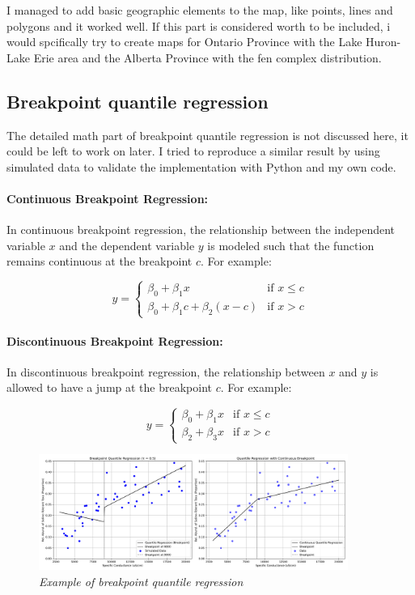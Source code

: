 \documentclass{article}
\begin{document}
I managed to add basic geographic elements to the map, like points, lines and polygons and it worked well. If this part is considered worth to be included, 
i would spcifically try to create maps for Ontario Province with the Lake Huron-Lake Erie area and the Alberta Province with the fen complex distribution.

\subsection{Breakpoint quantile regression}

The detailed math part of breakpoint quantile regression is not discussed here, it could be left to work on later.
I tried to reproduce a similar result by using simulated data to validate the implementation with Python and my own code.

\paragraph{Continuous Breakpoint Regression:}
In continuous breakpoint regression, the relationship between the independent variable \(x\) and the dependent variable \(y\) is modeled such that the function remains continuous at the breakpoint \(c\). For example:

\[
y = 
\begin{cases} 
\beta_0 + \beta_1 x & \text{if } x \leq c \\
\beta_0 + \beta_1 c + \beta_2 (x - c) & \text{if } x > c
\end{cases}
\]

\paragraph{Discontinuous Breakpoint Regression:}
In discontinuous breakpoint regression, the relationship between \(x\) and \(y\) is allowed to have a jump at the breakpoint \(c\). For example:

\[
y = 
\begin{cases} 
\beta_0 + \beta_1 x & \text{if } x \leq c \\
\beta_2 + \beta_3 x & \text{if } x > c
\end{cases}
\]

\begin{figure}[!h]
    \centering
    \includegraphics[width=0.9\textwidth]{../src_test/results/breakpoint_quantile_regression.png}
    \caption{\textit{Example of breakpoint quantile regression}}
    \label{fig:breakpoint_quantile_regression}
\end{figure}
\end{document}
